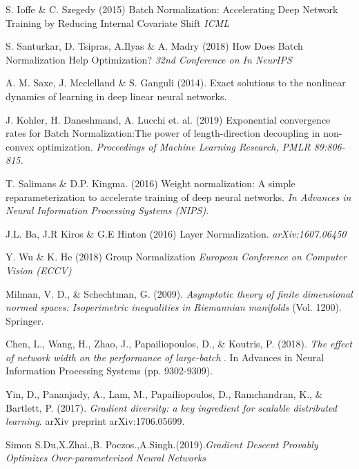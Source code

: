 \documentclass{article}
\begin{document}
\newpage

\medskip

\small

\begin{thebibliography}{9}
S. Ioffe \& C. Szegedy (2015) Batch Normalization: Accelerating Deep Network Training by Reducing Internal Covariate Shift \textit{ICML}
 
S. Santurkar, D. Tsipras, A.Ilyas \& A. Madry (2018) How Does Batch Normalization Help Optimization? \textit{32nd Conference on In NeurIPS}

A. M. Saxe, J. Mcclelland \& S. Ganguli (2014). Exact solutions to the nonlinear dynamics of learning in deep linear neural networks.
 
J. Kohler, H. Daneshmand, A. Lucchi et. al. (2019) Exponential convergence rates for Batch Normalization:The power of length-direction decoupling in non-convex optimization. 	\textit{Proceedings of Machine Learning Research, PMLR 89:806-815.}

T. Salimans \& D.P. Kingma. (2016) Weight normalization: A simple reparameterization to accelerate
training of deep neural networks. \textit{In Advances in Neural Information Processing Systems (NIPS)}.

J.L. Ba, J.R Kiros \& G.E Hinton (2016) Layer Normalization. \textit{arXiv:1607.06450}

Y. Wu \& K. He (2018) Group Normalization \textit{European Conference on Computer Vision (ECCV)}

Milman, V. D., \& Schechtman, G. (2009). \textit{Asymptotic theory of finite dimensional normed spaces: Isoperimetric inequalities in Riemannian manifolds} (Vol. 1200). Springer.

Chen, L., Wang, H., Zhao, J., Papailiopoulos, D., \& Koutris, P. (2018). \textit{The effect of network width on the performance of large-batch }. In Advances in Neural Information Processing Systems (pp. 9302-9309).

Yin, D., Pananjady, A., Lam, M., Papailiopoulos, D., Ramchandran, K., \& Bartlett, P. (2017). \textit{Gradient diversity: a key ingredient for scalable distributed learning}. arXiv preprint arXiv:1706.05699.

Simon S.Du,X.Zhai.,B. Poczos.,A.Singh.(2019).\textit{Gradient Descent Provably Optimizes Over-parameterized Neural Networks}


\end{thebibliography}
\end{document}
